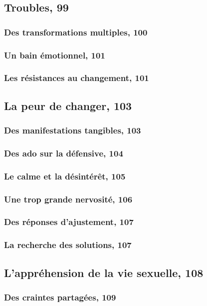 \documentclass[12pt]{report}
\begin{document}
\begin{itemize}
\chapter{Troubles, 99}
\subsection{Des transformations multiples, 100}
\subsection{Un bain émotionnel, 101}
\subsection{Les résistances au changement, 101}
\section{La peur de changer, 103}
\subsection{Des manifestations tangibles, 103}
\subsection{Des ado sur la défensive, 104}
\subsection{Le calme et la désintérêt, 105}
\subsection{Une trop grande nervosité, 106}
\subsection{Des réponses d'ajustement, 107}
\subsection{La recherche des solutions, 107}
\section{L'appréhension de la vie sexuelle, 108}
\subsection{Des craintes partagées, 109}

\end{itemize}
\end{document}
